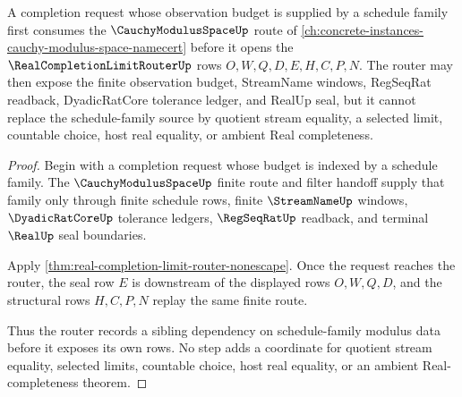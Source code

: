 \begin{theorem}
\label{thm:real-completion-limit-router-cauchy-modulus-space-sibling-route}
A completion request whose observation budget is supplied by a schedule family first consumes the $\CauchyModulusSpaceUp$ route of \autoref{ch:concrete-instances-cauchy-modulus-space-namecert} before it opens the $\RealCompletionLimitRouterUp$ rows $O,W,Q,D,E,H,C,P,N$. The router may then expose the finite observation budget, StreamName windows, RegSeqRat readback, DyadicRatCore tolerance ledger, and RealUp seal, but it cannot replace the schedule-family source by quotient stream equality, a selected limit, countable choice, host real equality, or ambient Real completeness.
\end{theorem}
\begin{proof}
Begin with a completion request whose budget is indexed by a schedule family. The $\CauchyModulusSpaceUp$ finite route and filter handoff supply that family only through finite schedule rows, finite $\StreamNameUp$ windows, $\DyadicRatCoreUp$ tolerance ledgers, $\RegSeqRatUp$ readback, and terminal $\RealUp$ seal boundaries.

Apply \autoref{thm:real-completion-limit-router-nonescape}. Once the request reaches the router, the seal row $E$ is downstream of the displayed rows $O,W,Q,D$, and the structural rows $H,C,P,N$ replay the same finite route.

Thus the router records a sibling dependency on schedule-family modulus data before it exposes its own rows. No step adds a coordinate for quotient stream equality, selected limits, countable choice, host real equality, or an ambient Real-completeness theorem.
\end{proof}

\begin{closurestatus}{\RealCompletionLimitRouterUp}
  \theoryclosure{\seedClosure}
  \formalstatus{\unformalizedV}
\end{closurestatus}
